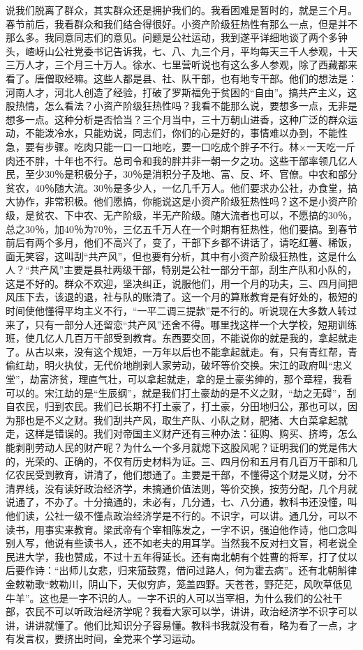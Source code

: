 说我们脱离了群众，其实群众还是拥护我们的。我看困难是暂时的，就是三个月。春节前后，我看群众和我们结合得很好。小资产阶级狂热性有那么一点，但是并不那么多。我同意同志们的意见。问题是公社运动，我到遂平详细地谈了两个多钟头，嵖岈山公社党委书记告诉我，七、八、九三个月，平均每天三千人参观，十天三万人才，三个月三十万人。徐水、七里营听说也有这么多人参观，除了西藏都来看了。唐僧取经嘛。这些人都是县、社、队干部，也有地专干部。他们的想法是：河南人才，河北人创造了经验，打破了罗斯福免于贫困的“自由”。搞共产主义，这股热情，怎么看法？小资产阶级狂热性吗？我看不能那么说，要想多一点，无非是想多一点。这种分析是否恰当？三个月当中，三十万朝山进香，这种广泛的群众运动，不能泼冷水，只能劝说，同志们，你们的心是好的，事情难以办到，不能性急，要有步骤。吃肉只能一口一口地吃，要一口吃成个胖子不行。林×一天吃一斤肉还不胖，十年也不行。总司令和我的胖并非一朝一夕之功。这些干部率领几亿人民，至少30％是积极分子，30％是消积分子及地、富、反、坏、官僚。中农和部分贫农，40％随大流。30％是多少人，一亿几千万人。他们要求办公社，办食堂，搞大协作，非常积极。他们愿搞，你能说这是小资产阶级狂热性吗？这不是小资产阶级，是贫农、下中农、无产阶级，半无产阶级。随大流者也可以，不愿搞的30％，总之30％，加40％为70％，三亿五千万人在一个时期有狂热性，他们要搞。到春节前后有两个多月，他们不高兴了，变了，干部下乡都不讲话了，请吃红薯、稀饭，面无笑容，这叫刮“共产风”，但也要有分析，其中有小资产阶级狂热性，这是什么人？“共产风”主要是县社两级干部，特别是公社一部分干部，刮生产队和小队的，这是不好的。群众不欢迎，坚决纠正，说服他们，用一个月的功夫，三、四月间把风压下去，该退的退，社与队的账清了。这一个月的算账教育是有好处的，极短的时间使他懂得平均主义不行，“一平二调三提款”是不行的。听说现在大多数人转过来了，只有一部分人还留恋“共产风”还舍不得。哪里找这样一个大学校，短期训练班，使几亿人几百万干部受到教育。东西要交回，不能说你的就是我的，拿起就走了。从古以来，没有这个规矩，一万年以后也不能拿起就走。有，只有青红帮，青偷红劫，明火执仗，无代价地削剥人家劳动，破坏等价交换。宋江的政府叫“忠义堂”，劫富济贫，理直气壮，可以拿起就走，拿的是土豪劣绅的，那个章程，我看可以的。宋江劫的是“生辰纲”，就是我们打土豪劫的是不义之财，“劫之无碍”，刮自农民，归到农民。我们已长期不打土豪了，打土豪，分田地归公，那也可以，因为那也是不义之财。我们刮共产风，取生产队、小队之财，肥猪、大白菜拿起就走，这样是错误的。我们对帝国主义财产还有三种办法：征购、购买、挤垮，怎么能剥削劳动人民的财产呢？为什么一个多月就熄下这股风呢？证明我们的党是伟大的，光荣的、正确的，不仅有历史材料为证。三、四月份和五月有几百万干部和几亿农民受到教育，讲清了，他们想通了。主要是干部，不懂得这个财是义财，分不清界线，没有读好政治经济学，未搞通价值法则，等价交换，按劳分配，几个月就说通了，不办了。十分搞通的，未必有，几分通，七、八分通，教科书还没懂，叫他们读，公社一级不懂点政治经济学是不行的。不识字，可以讲。通几分，可以不读书，用事实来教育。梁武帝有个宰相陈发之，一字不识，强迫他作诗，他口念叫别人写，他说有些读书人，还不如老夫的用耳学。当然我不反对扫文盲，柯老说全民进大学，我也赞成，不过十五年得延长。还有南北朝有个姓曹的将军，打了仗以后要作诗：“出师儿女悲，归来笳鼓霓，借问过路人，何为霍去病”。还有北朝斛律金敕勒歌“敕勒川，阴山下，天似穷庐，笼盖四野。天苍苍，野茫茫，风吹草低见牛羊”。这也是一字不识的人。一字不识的人可以当宰相，为什么我们的公社干部，农民不可以听政治经济学呢？我看大家可以学，讲讲，政治经济学不识字可以讲，讲讲就懂了。他们比知识分子容易懂。教科书我就没有看，略为看了一点，才有发言权，要挤出时间，全党来个学习运动。

